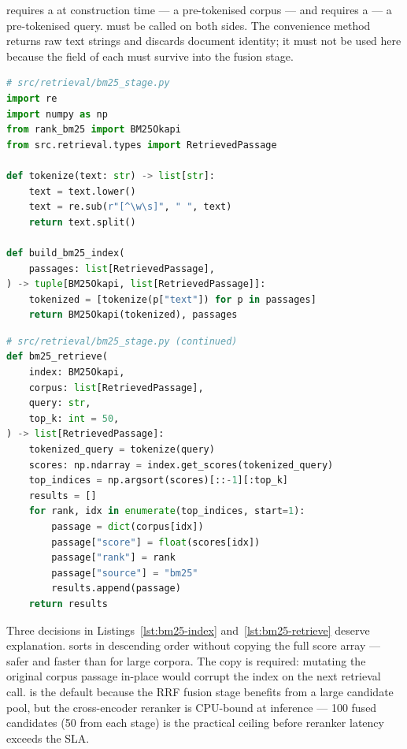 \begin{notebox}
 requires a  at construction time
--- a pre-tokenised corpus --- and  requires a
 --- a pre-tokenised query.  must be called
on both sides. The  convenience method returns raw text
strings and discards document identity; it must not be used here because the
 field of each  must survive into the fusion
stage.
\end{notebox}

\begin{lstlisting}[language=Python,
  caption={Tokenisation pipeline and BM25 index construction},
  label={lst:bm25-index}]
# src/retrieval/bm25_stage.py
import re
import numpy as np
from rank_bm25 import BM25Okapi
from src.retrieval.types import RetrievedPassage

def tokenize(text: str) -> list[str]:
    text = text.lower()
    text = re.sub(r"[^\w\s]", " ", text)
    return text.split()

def build_bm25_index(
    passages: list[RetrievedPassage],
) -> tuple[BM25Okapi, list[RetrievedPassage]]:
    tokenized = [tokenize(p["text"]) for p in passages]
    return BM25Okapi(tokenized), passages
\end{lstlisting}

\begin{lstlisting}[language=Python,
  caption={BM25 retrieval with rank assignment},
  label={lst:bm25-retrieve}]
# src/retrieval/bm25_stage.py (continued)
def bm25_retrieve(
    index: BM25Okapi,
    corpus: list[RetrievedPassage],
    query: str,
    top_k: int = 50,
) -> list[RetrievedPassage]:
    tokenized_query = tokenize(query)
    scores: np.ndarray = index.get_scores(tokenized_query)
    top_indices = np.argsort(scores)[::-1][:top_k]
    results = []
    for rank, idx in enumerate(top_indices, start=1):
        passage = dict(corpus[idx])
        passage["score"] = float(scores[idx])
        passage["rank"] = rank
        passage["source"] = "bm25"
        results.append(passage)
    return results
\end{lstlisting}

Three decisions in Listings~\ref{lst:bm25-index} and~\ref{lst:bm25-retrieve}
deserve explanation.  sorts in descending order
without copying the full score array --- safer and faster than
 for large corpora.
The  copy is required: mutating the original corpus
passage in-place would corrupt the index on the next retrieval call.
 is the default because the RRF fusion stage benefits from a
large candidate pool, but the cross-encoder reranker is CPU-bound at
inference --- 100 fused candidates (50 from each stage) is the practical
ceiling before reranker latency exceeds the SLA.


